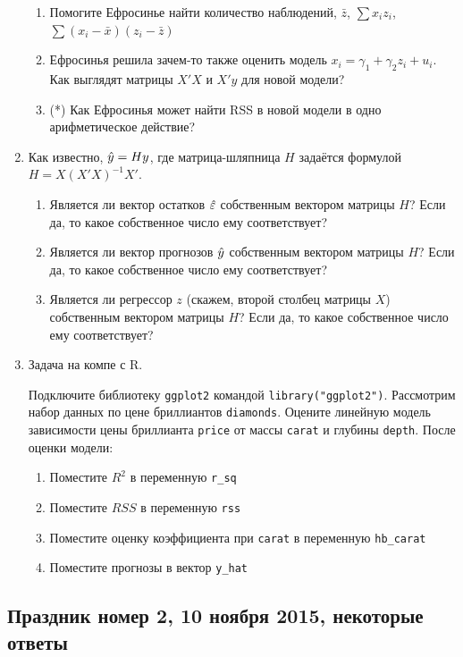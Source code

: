 \documentclass[12pt, a4paper]{article}
\begin{document}
\begin{enumerate}
\begin{enumerate}
\item Помогите Ефросинье найти количество наблюдений, $\bar{z}$, $\sum x_i z_i$, $\sum(x_i-\bar{x})(z_i-\bar{z})$
\item Ефросинья решила зачем-то также оценить модель $x_i = \gamma_1 + \gamma_2 z_i + u_i$. Как выглядят матрицы $X'X$ и $X'y$ для новой модели?
\item (*) Как Ефросинья может найти RSS в новой модели в одно арифметическое действие?
\end{enumerate}


\item Как известно, $\hat{y}=H y$, где матрица-шляпница $H$ задаётся формулой $H=X(X'X)^{-1}X'$.
\begin{enumerate}
\item Является ли вектор остатков $\hat{\varepsilon}$ собственным вектором матрицы $H$? Если да, то какое собственное число ему соответствует?
\item Является ли вектор прогнозов $\hat{y}$ собственным вектором матрицы $H$? Если да, то какое собственное число ему соответствует?
\item  Является ли регрессор $z$ (скажем, второй столбец матрицы $X$) собственным вектором матрицы $H$? Если да, то какое собственное число ему соответствует?
\end{enumerate}

\item Задача на компе с R.

Подключите библиотеку \verb|ggplot2| командой \verb|library("ggplot2")|. Рассмотрим набор данных по цене бриллиантов \verb|diamonds|. Оцените линейную модель зависимости цены бриллианта \verb|price| от массы \verb|carat| и глубины \verb|depth|. После оценки модели:
\begin{enumerate}
\item Поместите $R^2$ в переменную \verb|r_sq|
\item Поместите $RSS$ в переменную \verb|rss|
\item Поместите оценку коэффициента при \verb|carat| в переменную \verb|hb_carat|
\item Поместите прогнозы в вектор \verb|y_hat|
\end{enumerate}

\end{enumerate}


\subsection{Праздник номер 2, 10 ноября 2015, некоторые ответы}
\end{document}
